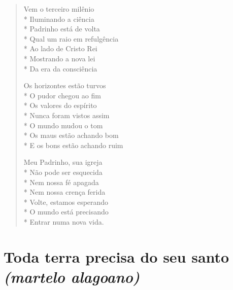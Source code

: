 \begin{verse}
Vem o terceiro milênio\\*
Iluminando a ciência\\*
Padrinho está de volta\\*
Qual um raio em refulgência\\*
Ao lado de Cristo Rei\\*
Mostrando a nova lei\\*
Da era da consciência

Os horizontes estão turvos\\*
O pudor chegou ao fim\\*
Os valores do espírito\\*
Nunca foram vistos assim\\*
O mundo mudou o tom\\*
Os maus estão achando bom\\*
E os bons estão achando ruim

Meu Padrinho, sua igreja\\*
Não pode ser esquecida\\*
Nem nossa fé apagada\\*
Nem nossa crença ferida\\*
Volte, estamos esperando\\*
O mundo está precisando\\*
Entrar numa nova vida.
\end{verse}


\chapter[Toda terra precisa do seu santo]{Toda terra precisa do seu santo\\\smallskip\textit{(martelo alagoano)}}

